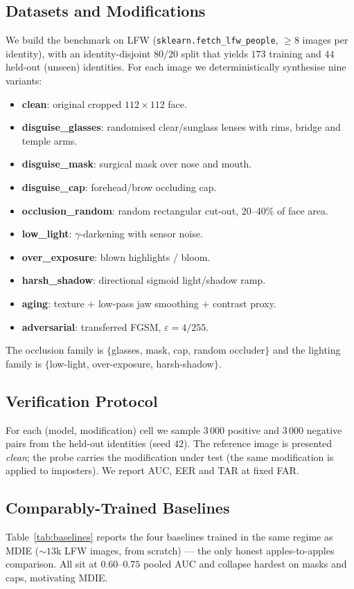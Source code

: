 \documentclass[10pt,conference]{IEEEtran}
\begin{document}
\subsection{Datasets and Modifications}
We build the benchmark on LFW (\texttt{sklearn.fetch\_lfw\_people},
$\geq\!8$ images per identity), with an identity-disjoint $80/20$ split that
yields $173$ training and $44$ held-out (unseen) identities. For each image we
deterministically synthesise nine variants:
\begin{itemize}\itemsep0pt
\item \textbf{clean}: original cropped $112{\times}112$ face.
\item \textbf{disguise\_glasses}: randomised clear/sunglass lenses with rims,
      bridge and temple arms.
\item \textbf{disguise\_mask}: surgical mask over nose and mouth.
\item \textbf{disguise\_cap}: forehead/brow occluding cap.
\item \textbf{occlusion\_random}: random rectangular cut-out, 20--40\% of
      face area.
\item \textbf{low\_light}: $\gamma$-darkening with sensor noise.
\item \textbf{over\_exposure}: blown highlights / bloom.
\item \textbf{harsh\_shadow}: directional sigmoid light/shadow ramp.
\item \textbf{aging}: texture + low-pass jaw smoothing + contrast proxy.
\item \textbf{adversarial}: transferred FGSM, $\varepsilon\!=\!4/255$.
\end{itemize}
The occlusion family is $\{$glasses, mask, cap, random occluder$\}$ and the
lighting family is $\{$low-light, over-exposure, harsh-shadow$\}$.

\subsection{Verification Protocol}
For each (model, modification) cell we sample $3\,000$ positive and $3\,000$
negative pairs from the held-out identities (seed $42$). The reference image is
presented \emph{clean}; the probe carries the modification under test (the same
modification is applied to imposters). We report AUC, EER and TAR at fixed FAR.

\subsection{Comparably-Trained Baselines}
Table~\ref{tab:baselines} reports the four baselines trained in the same regime
as MDIE ($\sim\!13$k LFW images, from scratch) --- the only honest
apples-to-apples comparison. All sit at $0.60$--$0.75$ pooled AUC and collapse
hardest on masks and caps, motivating MDIE.
\end{document}
